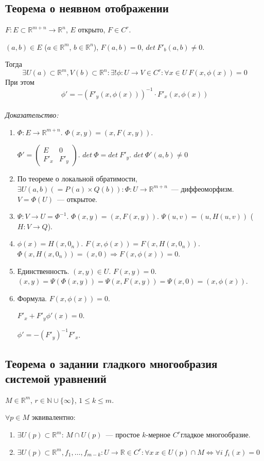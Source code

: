 \documentclass[paper=a4, fontsize=11pt]{article}
\begin{document}
\subsection{Теорема о неявном отображении}
$F: E \subset \mathds{R}^{m+n} \rightarrow \mathds{R}^n$, $E$ открыто, $F \in C^r$.

$(a,b) \in E$ ($a \in \mathds{R}^m$, $b \in \mathds{R}^n$), $F(a,b)=0$, $det\ F'_b(a,b) \neq 0$.

Тогда
$$\exists U(a) \subset \mathds{R}^m, V(b) \subset \mathds{R}^n: \exists! \phi: U \rightarrow V \in C^r: \forall x \in U\ F(x,\phi(x))=0$$
При этом
$$\phi' = -(F'_y(x,\phi(x)))^{-1} \cdot F'_x(x,\phi(x))$$
\\
\emph{Доказательство:}
\begin{enumerate}
    \item $\Phi: E \rightarrow \mathds{R}^{m+n}$. $\Phi(x,y) = (x,F(x,y))$.
    
    $\Phi' =
    \begin{pmatrix}
        E & 0\\
        F'_x & F'_y
    \end{pmatrix}$. $det\ \Phi = det\ F'_y$. $det\ \Phi'(a,b) \neq 0$
    \item По теореме о локальной обратимости,
    $\exists U(a,b) (= P(a) \times Q(b)): \Phi: U \rightarrow \mathds{R}^{m+n}$~--- диффеоморфизм. $V = \Phi(U)$~--- открытое.
    \item $\Psi: V \rightarrow U = \Phi^{-1}$. $\Phi(x,y) = (x,F(x,y))$. $\Psi(u,v) = (u,H(u,v))$ ($H: V \rightarrow Q$).
    \item $\phi(x) = H(x, 0_n)$. $F(x, \phi(x)) = F(x, H(x, 0_n))$. $\Phi(x,H(x,0_n))=(x,0) \Rightarrow F(x,\phi(x)) = 0$.
    \item Единственность. $(x,y) \in U$. $F(x,y)=0$. $(x,y) = \Psi(\Phi(x,y)) = \Psi(x,F(x,y)) = \Psi(x,0) = (x,\phi(x))$.
    \item Формула. $F(x,\phi(x)) = 0$.

    $F'_x + F'_y\phi'(x) = 0$.
    
    $\phi' = -(F'_y)^{-1}F'_x$.
\end{enumerate}

\subsection{Теорема о задании гладкого многообразия системой уравнений}
$M \in \mathds{R}^m$, $r \in \mathds{N} \cup \{\infty\}$, $1 \leq k \leq m$.

$\forall p \in M$ эквивалентно:
\begin{enumerate}
    \item $\exists U(p) \subset \mathds{R}^m$: $M \cap U(p)$~--- простое $k$-мерное $C^r$гладкое многообразие.
    \item $\exists U(p) \subset \mathds{R}^m, f_1,\dots,f_{m-k}: U \rightarrow \mathds{R} \in C^r:
    \forall x\ x \in U(p) \cap M \Leftrightarrow \forall i\ f_i(x)=0$
\end{enumerate}
\end{document}

